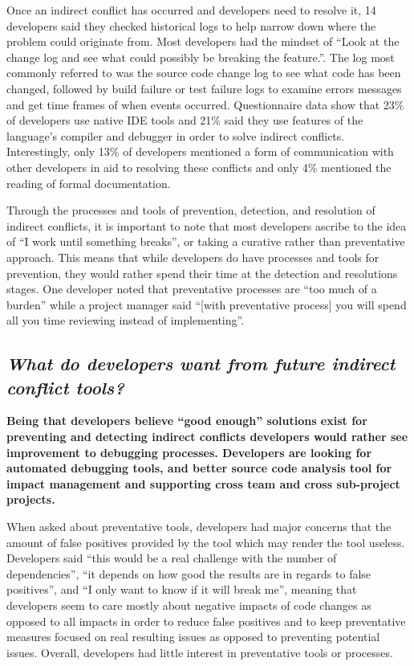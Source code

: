 \documentclass[conference]{IEEEtran}
\begin{document}
Once an indirect conflict has occurred and developers need to resolve it, 14 developers said
they checked historical logs to help narrow down where the problem could originate from. Most developers had the mindset of
``Look at the change log and see what could possibly be breaking the feature.''. The log most commonly referred to was the source
code change log to see what code has been changed, followed by build failure or test failure logs to examine errors messages and get time
frames of when events occurred. Questionnaire data show that 23\% of developers use native IDE tools and 21\% said they use
features of the language's compiler and debugger in order to solve indirect conflicts. Interestingly, only 13\% of developers
mentioned a form of communication with other developers in aid to resolving these conflicts and only 4\% mentioned the reading
of formal documentation.

Through the processes and tools of prevention, detection, and resolution of indirect conflicts, it is important to note that
most developers ascribe to the idea of ``I work until something breaks'', or taking a curative rather than preventative
approach. This means that while developers do have processes and tools for prevention, they would rather spend their time
at the detection and resolutions stages. One developer noted that preventative processes are ``too much of a burden''
while a project manager said ``[with preventative process] you will spend all you time reviewing instead of implementing''.

{}
\subsection*{ \it{What do developers want from future indirect conflict tools?}}

\bf{Being that developers believe ``good enough'' solutions exist for preventing and detecting indirect conflicts
developers would rather see improvement to debugging processes. Developers are looking for automated debugging tools,
and better source code analysis tool for impact management and supporting cross team and cross sub-project projects.}

\normalfont{}

When asked about preventative tools, developers had major concerns that the amount of false positives
provided by the tool which may render the tool useless. Developers said ``this would
be a real challenge with the number of dependencies'', ``it depends on how
good the results are in regards to false positives'', and ``I only want to know if it will break me'', meaning that
developers seem to care mostly about negative impacts of code changes as opposed to all impacts in order to reduce
false positives and to keep preventative measures focused on real resulting issues as opposed to preventing potential
issues. Overall, developers had little interest in preventative tools or processes.
\end{document}
